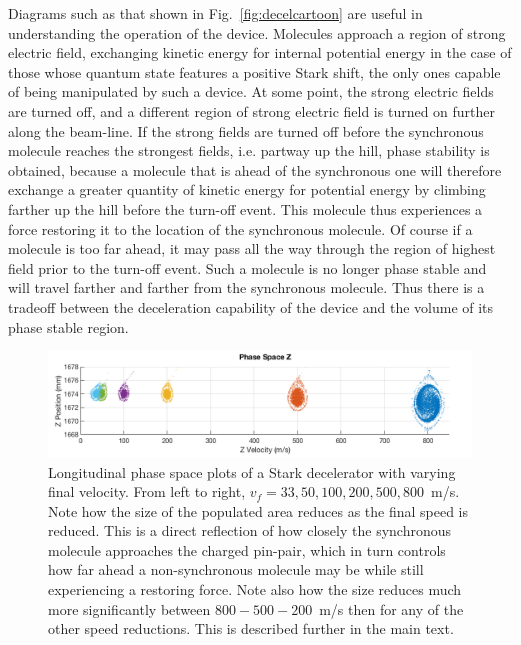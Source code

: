 Diagrams such as that shown in Fig.~\ref{fig:decelcartoon} are useful in understanding the operation of the device.
Molecules approach a region of strong electric field, exchanging kinetic energy for internal potential energy in the case of those whose quantum state features a positive Stark shift, the only ones capable of being manipulated by such a device.
At some point, the strong electric fields are turned off, and a different region of strong electric field is turned on further along the beam-line.
If the strong fields are turned off before the synchronous molecule reaches the strongest fields, i.e. partway up the hill, phase stability is obtained, because a molecule that is ahead of the synchronous one will therefore exchange a greater quantity of kinetic energy for potential energy by climbing farther up the hill before the turn-off event.
This molecule thus experiences a force restoring it to the location of the synchronous molecule.
Of course if a molecule is too far ahead, it may pass all the way through the region of highest field prior to the turn-off event. Such a molecule is no longer phase stable and will travel farther and farther from the synchronous molecule.
Thus there is a tradeoff between the deceleration capability of the device and the volume of its phase stable region.

\begin{figure}[t!]
\centering
\includegraphics[width=\linewidth]{Slowing/phaseangles.png}%
\caption[Phase Space for Different Final Velocities]{\label{fig:variousphaseangles}
Longitudinal phase space plots of a Stark decelerator with varying final velocity. From left to right, $v_f=33, 50, 100, 200, 500, 800$~m/s. Note how the size of the populated area reduces as the final speed is reduced.  This is a direct reflection of how closely the synchronous molecule approaches the charged pin-pair, which in turn controls how far ahead a non-synchronous molecule may be while still experiencing a restoring force. Note also how the size reduces much more significantly between $800-500-200$~m/s then for any of the other speed reductions. This is described further in the main text. 
}
\end{figure}

